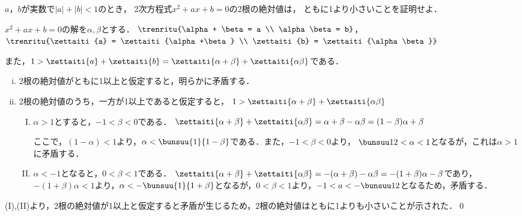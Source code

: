 \begin{problem}
  $a$，$b$が実数で$|a|+|b|<1$のとき，
2次方程式$x^2+ax+b=0$の2根の絶対値は，
ともに1より小さいことを証明せよ．
\end{problem}

$x^2 + ax + b = 0$の解を$\alpha, \beta$とする．
$\trenritu{\alpha + \beta = a \\ \alpha\beta = b}$，$\trenritu{\zettaiti{a} = \zettaiti{\alpha+\beta} \\ \zettaiti{b} = \zettaiti{\alpha\beta}}$

また，$1 > \zettaiti{a} + \zettaiti{b} = \zettaiti{\alpha + \beta} + \zettaiti{\alpha\beta}$である．

\begin{enumerate}[(i)]
  \item 2根の絶対値がともに1以上と仮定すると，明らかに矛盾する．
  \item 2根の絶対値のうち，一方が1以上であると仮定すると，
  $1 > \zettaiti{\alpha + \beta} + \zettaiti{\alpha\beta}$
  \begin{enumerate}[(I)]
    \item $\alpha > 1$とすると，$-1 < \beta < 0$である．
    $\zettaiti{\alpha+\beta} + \zettaiti{\alpha\beta} = \alpha +\beta -\alpha\beta =(1-\beta)\alpha + \beta$

    ここで，$(1-\alpha)<1$より，$\alpha < \bunsuu{1}{1-\beta}$である．また，$-1 < \beta <0$より，
    $\bunsuu12 < \alpha < 1$となるが，これは$\alpha > 1$に矛盾する．

    \item $\alpha < -1$となると，$0 < \beta < 1$である．
    $\zettaiti{\alpha + \beta} + \zettaiti{\alpha\beta} = -(\alpha + \beta) - \alpha\beta
    =-(1+\beta)\alpha - \beta$であり，$-(1+\beta)\alpha < 1$より，$\alpha < -\bunsuu{1}{1+\beta}$となるが，$0<\beta<1$より，$-1 < a < -\bunsuu12$となるため，矛盾する．
  \end{enumerate}
\end{enumerate}

(I),(II)より，2根の絶対値が1以上と仮定すると矛盾が生じるため，2根の絶対値はともに1よりも小さいことが示された．\qed
